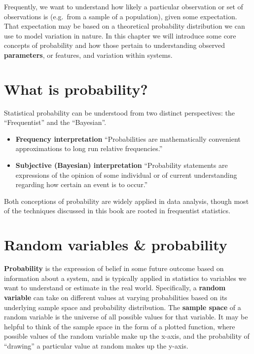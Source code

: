 \documentclass[
]{book}
\providecommand{\tightlist}{%
  \setlength{\itemsep}{0pt}\setlength{\parskip}{0pt}}
\begin{document}
Frequently, we want to understand how likely a particular observation or set of observations is (e.g.~from a sample of a population), given some expectation. That expectation may be based on a theoretical probability distribution we can use to model variation in nature. In this chapter we will introduce some core concepts of probability and how those pertain to understanding observed \textbf{parameters}, or features, and variation within systems.

\hypertarget{what-is-probability}{%
\section{What is probability?}\label{what-is-probability}}

Statistical probability can be understood from two distinct perspectives: the ``Frequentist'' and the ``Bayesian''.

\begin{itemize}
\tightlist
\item
  \textbf{Frequency interpretation}
  ``Probabilities are mathematically convenient approximations to long run relative frequencies.''
\item
  \textbf{Subjective (Bayesian) interpretation}
  ``Probability statements are expressions of the opinion of some individual or of current understanding regarding how certain an event is to occur.''
\end{itemize}

Both conceptions of probability are widely applied in data analysis, though most of the techniques discussed in this book are rooted in frequentist statistics.

\hypertarget{random-variables-probability}{%
\section{Random variables \& probability}\label{random-variables-probability}}

\textbf{Probability} is the expression of belief in some future outcome based on information about a system, and is typically applied in statistics to variables we want to understand or estimate in the real world. Specifically, a \textbf{random variable} can take on different values at varying probabilities based on its underlying sample space and probability distribution. The \textbf{sample space} of a random variable is the universe of all possible values for that variable. It may be helpful to think of the sample space in the form of a plotted function, where possible values of the random variable make up the x-axis, and the probability of ``drawing'' a particular value at random makes up the y-axis.
\end{document}
